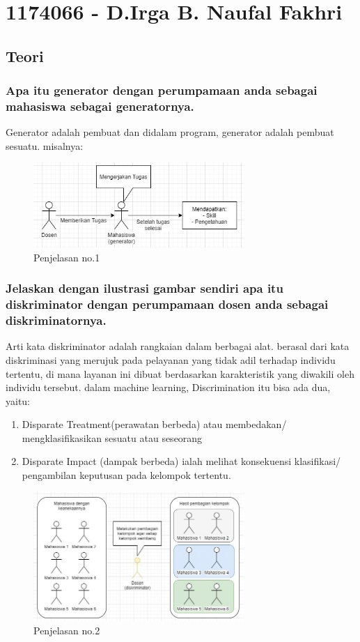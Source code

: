 \section{1174066 - D.Irga B. Naufal Fakhri}
\subsection{Teori}
\subsubsection{Apa itu generator dengan perumpamaan anda sebagai mahasiswa sebagai generatornya.}
\hfill\break
Generator adalah pembuat dan didalam program, generator adalah pembuat sesuatu. misalnya: 
\begin{figure}[H]
	\centering
	\includegraphics[width=8cm]{figures/1174066/8/1.jpg}
	\caption{Penjelasan no.1}
\end{figure}

\subsubsection{Jelaskan dengan ilustrasi gambar sendiri apa itu diskriminator dengan perumpamaan dosen anda sebagai diskriminatornya.}
\hfill\break
Arti kata diskriminator adalah rangkaian dalam berbagai alat. berasal dari kata diskriminasi yang merujuk pada pelayanan yang tidak adil terhadap individu tertentu, di mana layanan ini dibuat berdasarkan karakteristik yang diwakili oleh individu tersebut. dalam machine learning, Discrimination itu bisa ada dua, yaitu:
\begin{enumerate}
\item Disparate Treatment(perawatan berbeda) atau membedakan/ mengklasifikasikan sesuatu atau seseorang
\item Disparate Impact (dampak berbeda) ialah melihat konsekuensi klasifikasi/ pengambilan keputusan pada kelompok tertentu.
\end{enumerate}
\begin{figure}[H]
	\centering
	\includegraphics[width=8cm]{figures/1174066/8/2.jpg}
	\caption{Penjelasan no.2}
\end{figure}

